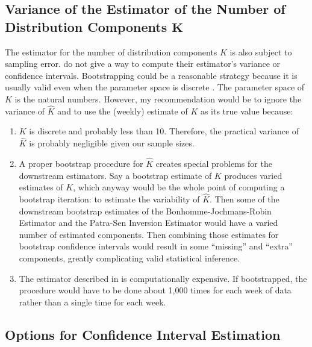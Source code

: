 \documentclass[english]{article}
\begin{document}
\subsection{Variance of the Estimator of the Number of Distribution Components
$\boldsymbol{K}$}

The estimator for the number of distribution components $K$ is also
subject to sampling error. \cite{KwonMbakop2021} do not give a way
to compute their estimator's variance or confidence intervals. Bootstrapping
could be a reasonable strategy because it is usually valid even when
the parameter space is discrete \cite{newton1996bootstrapping}. The
parameter space of $K$ is the natural numbers. However, my recommendation
would be to ignore the variance of $\hat{K}$ and to use the (weekly)
estimate of $K$ as its true value because:
\begin{enumerate}
\item $K$ is discrete and probably less than 10. Therefore, the practical
variance of $\hat{K}$ is probably negligible given our sample sizes.
\item A proper bootstrap procedure for $\hat{K}$ creates special problems
for the downstream estimators. Say a bootstrap estimate of $K$ produces
varied estimates of $K$, which anyway would be the whole point of
computing a bootstrap iteration: to estimate the variability of $\hat{K}$.
Then some of the downstream bootstrap estimates of the Bonhomme-Jochmans-Robin
Estimator and the Patra-Sen Inversion Estimator would have a varied
number of estimated components. Then combining those estimates for
bootstrap confidence intervals would result in some ``missing''
and ``extra'' components, greatly complicating valid statistical
inference.
\item The estimator described in \cite{KwonMbakop2021} is computationally
expensive. If bootstrapped, the procedure would have to be done about
1,000 times for each week of data rather than a single time for each
week.
\end{enumerate}

\subsection{Options for Confidence Interval Estimation\label{subsec:Options-for-Confidence-Interval-Estimation}}
\end{document}
